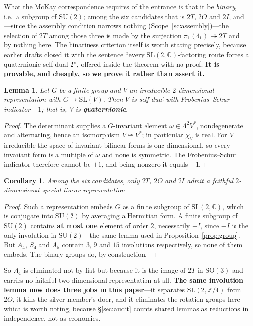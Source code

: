 \documentclass[11pt,reqno]{amsart}
\theoremstyle{plain}
\newtheorem{lemma}[theorem]{Lemma}
\newtheorem{corollary}[theorem]{Corollary}
\theoremstyle{definition}
\theoremstyle{remark}
\newcommand{\Z}{\mathbb{Z}}
\newcommand{\C}{\mathbb{C}}
\newcommand{\SL}{\mathrm{SL}}
\newcommand{\SU}{\mathrm{SU}}
\begin{document}
What the McKay correspondence requires of the entrance is that it be \emph{binary}, i.e.\ a
subgroup of $\SU(2)$; among the six candidates that is $2T$, $2O$ and $2I$, and---since the
assembly condition narrows nothing (Scope~\ref{sc:assembly})---the selection of $2T$ among
those three is made by the surjection $\pi_1(4_1)\twoheadrightarrow2T$ and by nothing here.
The binariness criterion itself is worth stating precisely, because earlier drafts closed it
with the sentence ``every $\SL(2,\C)$-factoring route forces a quaternionic self-dual $2$'',
offered inside the theorem with no proof. \textbf{It is provable, and cheaply, so we
prove it rather than assert it.}

\begin{lemma}\label{lem:quat}
Let $G$ be a finite group and $V$ an irreducible $2$-dimensional representation with
$G\to\SL(V)$. Then $V$ is self-dual with Frobenius--Schur indicator $-1$; that is,
$V$ is \textbf{quaternionic}.
\end{lemma}

\begin{proof}
The determinant supplies a $G$-invariant element $\omega\in\Lambda^2V^*$, nondegenerate
and alternating, hence an isomorphism $V\cong V^*$; in particular $\chi_V$ is real. For
$V$ irreducible the space of invariant bilinear forms is one-dimensional, so every
invariant form is a multiple of $\omega$ and none is symmetric. The Frobenius--Schur
indicator therefore cannot be $+1$, and being nonzero it equals $-1$.
\end{proof}

\begin{corollary}\label{cor:onlybinary}
Among the six candidates, only $2T$, $2O$ and $2I$ admit a faithful $2$-dimensional
special-linear representation.
\end{corollary}

\begin{proof}
Such a representation embeds $G$ as a finite subgroup of $\SL(2,\C)$, which is
conjugate into $\SU(2)$ by averaging a Hermitian form. A finite subgroup of $\SU(2)$
contains \textbf{at most one} element of order $2$, necessarily $-I$, since $-I$ is the
only involution in $\SU(2)$---the same lemma used in Proposition~\ref{prop:group}. But $A_4$, $S_4$ and $A_5$ contain $3$, $9$
and $15$ involutions respectively, so none of them embeds. The binary groups do, by
construction.
\end{proof}

\noindent So $A_4$ is eliminated not by fiat but because it is the image of $2T$ in
$\mathrm{SO}(3)$ and carries no faithful two-dimensional representation at all.
\textbf{The same involution lemma now does three jobs in this paper}---it separates
$\SL(2,\Z/4)$ from $2O$, it kills the silver member's door, and it eliminates the
rotation groups here---which is worth noting, because \S\ref{sec:audit} counts shared
lemmas as reductions in independence, not as economies.
\end{document}
